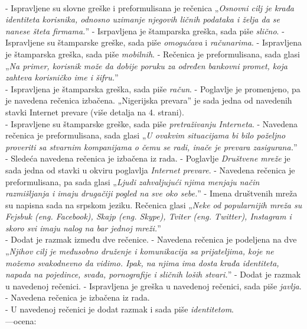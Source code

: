 \documentclass[a4paper]{report}
\begin{document}
{{		\\- Ispravljene su slovne greške i preformulisana je rečenica „\textit{Osnovni cilj je krađa identiteta korisnika, odnosno uzimanje njegovih ličnih podataka i želja da se nanese šteta firmama.}”\newline
		- Isrpavljena je štamparska greška, sada piše \textit{slično}.\newline
		- Ispravljene su štamparske greške, sada piše \textit{omogućava} i \textit{računarima}.\newline
		- Ispravljena je štamparska greška, sada piše \textit{mobilnih}.\newline
		- Rečenica je preformulisana, sada glasi „\textit{Na primer, korisnik može da dobije poruku za određen bankovni promet, koja zahteva korisničko ime i šifru.}”
		\\- Ispravljena je štamparska greška, sada piše \textit{račun}.\newline
		- Poglavlje je promenjeno, pa je navedena rečenica izbačena. „Nigerijska prevara” je sada jedna od navedenih stavki Internet prevare (više detalja na 4. strani).
		\\- Ispravljene su štamparske greške, sada piše \textit{pretraživanju Interneta}.\newline
		- Navedena rečenica je preformulisana, sada glasi „\textit{U ovakvim situacijama bi bilo poželjno proveriti sa stvarnim kompanijama o čemu se radi, inače je prevara zasigurana.}”
		\\- Sledeća navedena rečenica je izbačena iz rada.\newline
		- Poglavlje \textit{Društvene mreže} je sada jedna od stavki u okviru poglavlja \textit{Internet prevare}.\newline
		- Navedena rečenica je preformulisana, pa sada glasi „\textit{Ljudi zahvaljujući njima menjaju način razmišljanja i imaju drugačiji pogled na sve oko sebe.}”\newline
		- Imena društvenih mreža su napisna sada na srpskom jeziku. Rečenica glasi „\textit{Neke od popularnijih mreža su Fejsbuk (eng. Facebook), Skajp (eng. Skype), Tviter (eng. Twitter), Instagram i skoro svi imaju nalog na bar jednoj mreži.}”
		\\- Dodat je razmak između dve rečenice.\newline
		- Navedena rečenica je podeljena na dve „\textit{Njihov cilj je međusobno druženje i komunikacija sa prijateljima, koje ne možemo svakodnevno da vidimo. Ipak, na njima ima dosta krađa identiteta, napada na pojedince, svađa, pornografije i sličnih loših stvari.}”\newline
		- Dodat je razmak u navedenoj rečenici.\newline
		- Ispravljena je greška u navedenoj rečenici, sada piše \textit{javlja}.\newline
		- Navedena rečenica je izbačena iz rada.
		\\- U navedenoj rečenici je dodat razmak i sada piše \textit{identitetom}.\newline
		\\---ocena:} }
\end{document}
